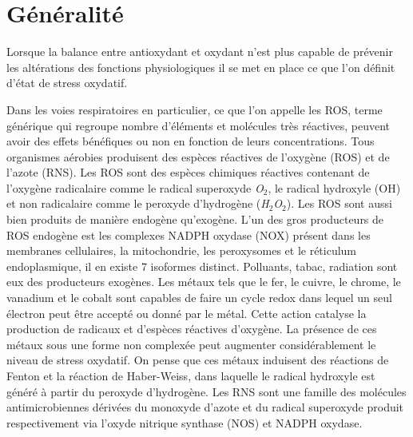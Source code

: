 
\chapter{Généralité} %


\label{ch:03-01} %



Lorsque la balance entre antioxydant et oxydant n’est plus capable de prévenir les altérations des fonctions physiologiques il se met en place ce que l’on définit d’état de stress oxydatif. 

Dans les voies respiratoires en particulier, ce que l’on appelle les ROS, terme générique qui regroupe nombre d’éléments et molécules très réactives, peuvent avoir des effets bénéfiques ou non en fonction de leurs concentrations. Tous organismes aérobies produisent des espèces réactives de l’oxygène (ROS) et de l’azote (RNS). Les ROS sont des espèces chimiques réactives contenant de l’oxygène radicalaire comme le radical superoxyde \textit{O}$_{2}$\up{-}, le radical hydroxyle (OH) et non radicalaire comme le peroxyde d’hydrogène (\textit{H}$_{2}$\textit{O}$_{2}$). Les ROS sont aussi bien produits de manière endogène qu’exogène. L’un des gros producteurs de ROS endogène est les complexes NADPH oxydase (NOX) présent dans les membranes cellulaires, la mitochondrie, les peroxysomes et le réticulum endoplasmique, il en existe 7 isoformes distinct. Polluants, tabac, radiation sont eux des producteurs exogènes. Les métaux tels que le fer, le cuivre, le chrome, le vanadium et le cobalt sont capables de faire un cycle redox dans lequel un seul électron peut être accepté ou donné par le métal. Cette action catalyse la production de radicaux et d'espèces réactives d'oxygène. La présence de ces métaux sous une forme non complexée peut augmenter considérablement le niveau de stress oxydatif. On pense que ces métaux induisent des réactions de Fenton et la réaction de Haber-Weiss, dans laquelle le radical hydroxyle est généré à partir du peroxyde d'hydrogène.
Les RNS sont une famille des molécules antimicrobiennes dérivées du monoxyde d'azote et du radical superoxyde produit respectivement via l’oxyde nitrique synthase (NOS) et NADPH oxydase.

